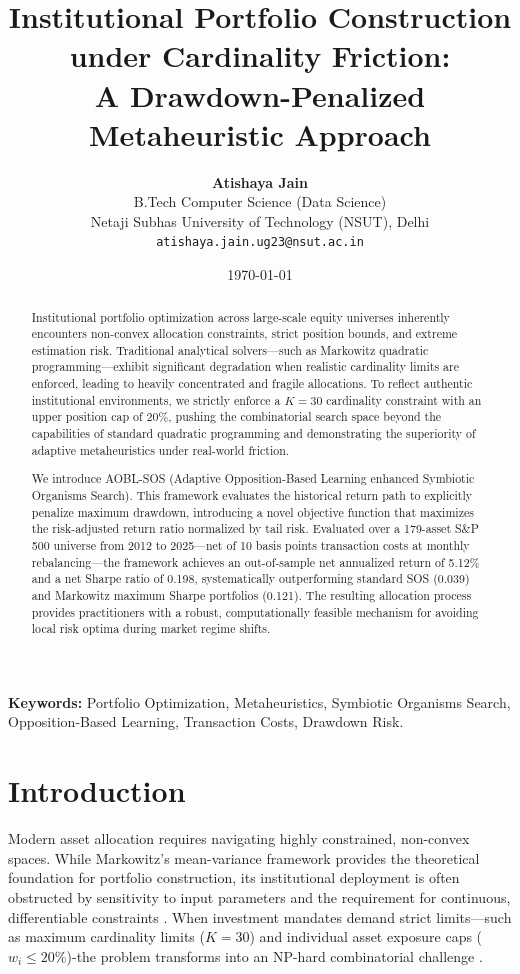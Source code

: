 \documentclass[11pt,a4paper]{article}
\title{\textbf{Institutional Portfolio Construction under Cardinality Friction:\\A Drawdown-Penalized Metaheuristic Approach}}
\author{
    \textbf{Atishaya Jain}\\
    \small B.Tech Computer Science (Data Science)\\
    \small Netaji Subhas University of Technology (NSUT), Delhi\\
    \small \texttt{atishaya.jain.ug23@nsut.ac.in}
}
\date{\today}
\begin{document}
\maketitle

\begin{abstract}
Institutional portfolio optimization across large-scale equity universes inherently encounters non-convex allocation constraints, strict position bounds, and extreme estimation risk. Traditional analytical solvers—such as Markowitz quadratic programming—exhibit significant degradation when realistic cardinality limits are enforced, leading to heavily concentrated and fragile allocations. To reflect authentic institutional environments, we strictly enforce a $K=30$ cardinality constraint with an upper position cap of 20\%, pushing the combinatorial search space beyond the capabilities of standard quadratic programming and demonstrating the superiority of adaptive metaheuristics under real-world friction.

We introduce AOBL-SOS (Adaptive Opposition-Based Learning enhanced Symbiotic Organisms Search). This framework evaluates the historical return path to explicitly penalize maximum drawdown, introducing a novel objective function that maximizes the risk-adjusted return ratio normalized by tail risk. Evaluated over a 179-asset S\&P 500 universe from 2012 to 2025—net of 10 basis points transaction costs at monthly rebalancing—the framework achieves an out-of-sample net annualized return of 5.12\% and a net Sharpe ratio of 0.198, systematically outperforming standard SOS (0.039) and Markowitz maximum Sharpe portfolios (0.121). The resulting allocation process provides practitioners with a robust, computationally feasible mechanism for avoiding local risk optima during market regime shifts.
\end{abstract}

\vspace{0.5cm}
\noindent \textbf{Keywords:} Portfolio Optimization, Metaheuristics, Symbiotic Organisms Search, Opposition-Based Learning, Transaction Costs, Drawdown Risk.

\newpage

\section{Introduction}
Modern asset allocation requires navigating highly constrained, non-convex spaces. While Markowitz's \cite{markowitz1952} mean-variance framework provides the theoretical foundation for portfolio construction, its institutional deployment is often obstructed by sensitivity to input parameters and the requirement for continuous, differentiable constraints \cite{ledoit2004}. When investment mandates demand strict limits—such as maximum cardinality limits ($K=30$) and individual asset exposure caps ($w_i \le 20\%$)-the problem transforms into an NP-hard combinatorial challenge \cite{chang2000}.
\end{document}
